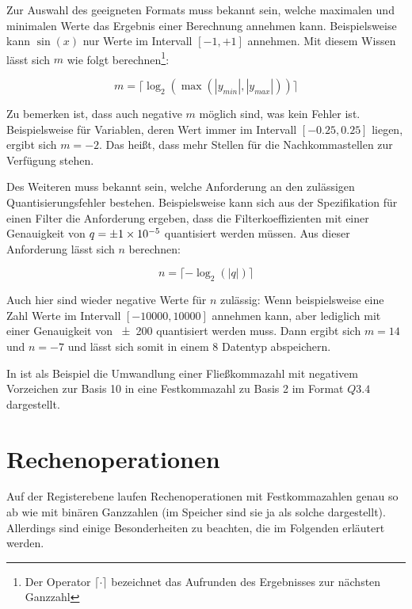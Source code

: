 Zur Auswahl des geeigneten Formats muss bekannt sein, welche maximalen und minimalen Werte das Ergebnis einer Berechnung annehmen kann. Beispielsweise kann $\sin(x)$ nur Werte im Intervall $[-1, +1]$ annehmen. Mit diesem Wissen lässt sich $m$ wie folgt berechnen\footnote{Der Operator $\lceil \cdot \rceil$ bezeichnet das Aufrunden des Ergebnisses zur nächsten Ganzzahl}:

\[m=\lceil \log_2(\max(|y_{min}|,|y_{max}|)) \rceil \]

Zu bemerken ist, dass auch negative $m$ möglich sind, was kein Fehler ist. Beispielsweise für Variablen, deren Wert immer im Intervall $[-0.25, 0.25]$ liegen, ergibt sich $m=-2$. Das heißt, dass mehr Stellen für die Nachkommastellen zur Verfügung stehen.

Des Weiteren muss bekannt sein, welche Anforderung an den zulässigen Quantisierungsfehler bestehen. Beispielsweise kann sich aus der Spezifikation für einen Filter die Anforderung ergeben, dass die Filterkoeffizienten mit einer Genauigkeit von $q=\num{\pm1e-5}$ quantisiert werden müssen. Aus dieser Anforderung lässt sich $n$ berechnen:

\[n=\lceil -\log_2(|q|) \rceil \]

Auch hier sind wieder negative Werte für $n$ zulässig: Wenn beispielsweise eine Zahl Werte im Intervall $[-10000, 10000]$ annehmen kann, aber lediglich mit einer Genauigkeit von \num{\pm200} quantisiert werden muss. Dann ergibt sich $m=14$ und $n=-7$ und lässt sich somit in einem \SI{8}{\bit} Datentyp abspeichern.

In  ist als Beispiel die Umwandlung einer Fließkommazahl mit negativem Vorzeichen zur Basis 10 in eine Festkommazahl zu Basis 2 im Format $Q3.4$ dargestellt.



\section{Rechenoperationen}
Auf der Registerebene laufen Rechenoperationen mit Festkommazahlen genau so ab wie mit binären Ganzzahlen (im Speicher sind sie ja als solche dargestellt). Allerdings sind einige Besonderheiten zu beachten, die im Folgenden erläutert werden.

